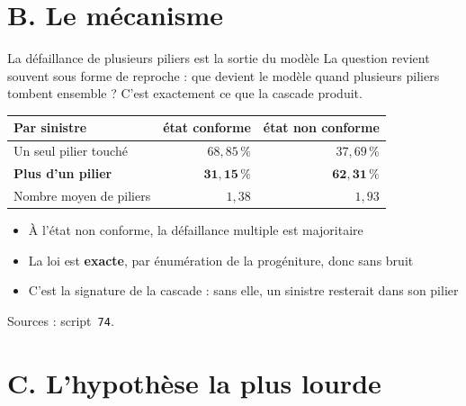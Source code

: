 \documentclass[11pt]{beamer}
\begin{document}
\section*{B. Le mécanisme}

\begin{frame}{La défaillance de plusieurs piliers est la sortie du modèle}
\small
La question revient souvent sous forme de reproche : que devient le modèle quand plusieurs
piliers tombent ensemble ? C'est exactement ce que la cascade produit.
\vspace{1mm}

\begin{center}\small
\begin{tabular}{@{}l r r@{}}
\toprule
\textbf{Par sinistre} & \textbf{état conforme} & \textbf{état non conforme} \\
\midrule
Un seul pilier touché & $68{,}85\,\%$ & $37{,}69\,\%$ \\
\textbf{Plus d'un pilier} & $\mathbf{31{,}15\,\%}$ & $\mathbf{62{,}31\,\%}$ \\
\midrule
Nombre moyen de piliers & $1{,}38$ & $1{,}93$ \\
\bottomrule
\end{tabular}
\end{center}
\vspace{2mm}

\begin{itemize}\itemsep4pt
  \item \alert{À l'état non conforme, la défaillance multiple est majoritaire}
  \item La loi est \textbf{exacte}, par énumération de la progéniture, donc sans bruit
  \item C'est la signature de la cascade : sans elle, un sinistre resterait dans son pilier
\end{itemize}
\vspace{1mm}
{\scriptsize Sources : script~\texttt{74}.}
\end{frame}

\section*{C. L'hypothèse la plus lourde}
\end{document}
